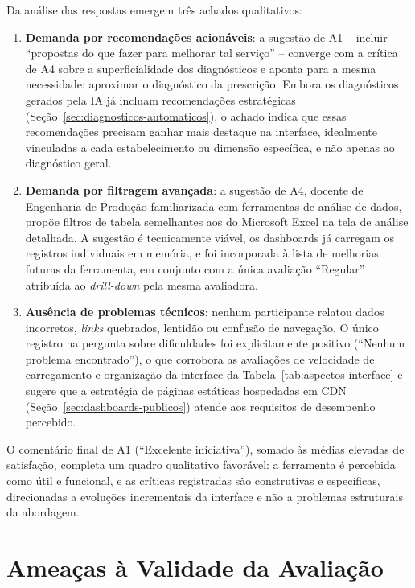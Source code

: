 Da análise das respostas emergem três achados qualitativos:

\begin{enumerate}
    \item \textbf{Demanda por recomendações acionáveis}: a sugestão de A1 -- incluir ``propostas do que fazer para melhorar tal serviço'' -- converge com a crítica de A4 sobre a superficialidade dos diagnósticos e aponta para a mesma necessidade: aproximar o diagnóstico da prescrição. Embora os diagnósticos gerados pela IA já incluam recomendações estratégicas (Seção~\ref{sec:diagnosticos-automaticos}), o achado indica que essas recomendações precisam ganhar mais destaque na interface, idealmente vinculadas a cada estabelecimento ou dimensão específica, e não apenas ao diagnóstico geral.
    \item \textbf{Demanda por filtragem avançada}: a sugestão de A4, docente de Engenharia de Produção familiarizada com ferramentas de análise de dados, propõe filtros de tabela semelhantes aos do Microsoft Excel na tela de análise detalhada. A sugestão é tecnicamente viável, os dashboards já carregam os registros individuais em memória, e foi incorporada à lista de melhorias futuras da ferramenta, em conjunto com a única avaliação ``Regular'' atribuída ao \textit{drill-down} pela mesma avaliadora.
    \item \textbf{Ausência de problemas técnicos}: nenhum participante relatou dados incorretos, \textit{links} quebrados, lentidão ou confusão de navegação. O único registro na pergunta sobre dificuldades foi explicitamente positivo (``Nenhum problema encontrado''), o que corrobora as avaliações de velocidade de carregamento e organização da interface da Tabela~\ref{tab:aspectos-interface} e sugere que a estratégia de páginas estáticas hospedadas em CDN (Seção~\ref{sec:dashboards-publicos}) atende aos requisitos de desempenho percebido.
\end{enumerate}

O comentário final de A1 (``Excelente iniciativa''), somado às médias elevadas de satisfação, completa um quadro qualitativo favorável: a ferramenta é percebida como útil e funcional, e as críticas registradas são construtivas e específicas, direcionadas a evoluções incrementais da interface e não a problemas estruturais da abordagem.

\section{Ameaças à Validade da Avaliação}
\label{sec:ameacas-validade-tam}

